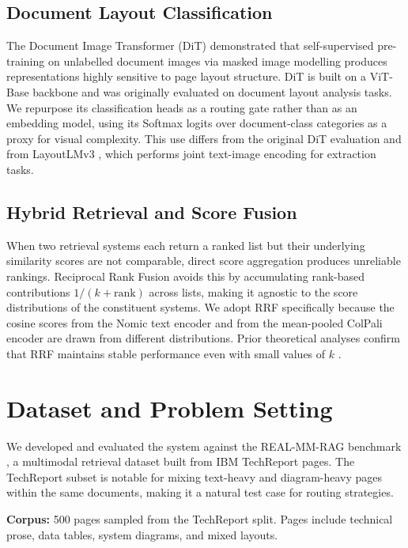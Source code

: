 \documentclass[conference]{IEEEtran}
\begin{document}
\subsection{Document Layout Classification}
The Document Image Transformer (DiT) \cite{li2022dit} demonstrated that self-supervised pre-training on unlabelled document images via masked image modelling produces representations highly sensitive to page layout structure. DiT is built on a ViT-Base backbone \cite{li2022dit} and was originally evaluated on document layout analysis tasks. We repurpose its classification heads as a routing gate rather than as an embedding model, using its Softmax logits over document-class categories as a proxy for visual complexity. This use differs from the original DiT evaluation and from LayoutLMv3 \cite{huang2022layoutlmv3}, which performs joint text-image encoding for extraction tasks.
 
\subsection{Hybrid Retrieval and Score Fusion}
When two retrieval systems each return a ranked list but their underlying similarity scores are not comparable, direct score aggregation produces unreliable rankings. Reciprocal Rank Fusion \cite{cormack2009reciprocal} avoids this by accumulating rank-based contributions $1/(k + \text{rank})$ across lists, making it agnostic to the score distributions of the constituent systems. We adopt RRF specifically because the cosine scores from the Nomic text encoder and from the mean-pooled ColPali encoder are drawn from different distributions. Prior theoretical analyses confirm that RRF maintains stable performance even with small values of $k$ \cite{bai2023theoretical}.
 
\section{Dataset and Problem Setting}
 
We developed and evaluated the system against the REAL-MM-RAG benchmark \cite{ma2024realmmrag}, a multimodal retrieval dataset built from IBM TechReport pages. The TechReport subset is notable for mixing text-heavy and diagram-heavy pages within the same documents, making it a natural test case for routing strategies.
 
\textbf{Corpus:} 500 pages sampled from the TechReport split. Pages include technical prose, data tables, system diagrams, and mixed layouts.
 
\end{document}
